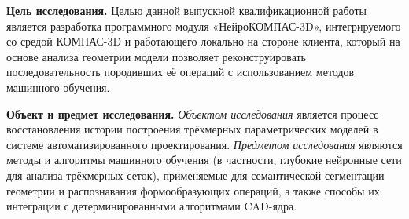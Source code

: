 \textbf{Цель исследования.} Целью данной выпускной квалификационной работы является разработка программного модуля «НейроКОМПАС-3D», интегрируемого со средой КОМПАС-3D и работающего локально на стороне клиента, который на основе анализа геометрии модели позволяет реконструировать последовательность породивших её операций с использованием методов машинного обучения.

\textbf{Объект и предмет исследования.} 
\textit{Объектом исследования} является процесс восстановления истории построения трёхмерных параметрических моделей в системе автоматизированного проектирования.
\textit{Предметом исследования} являются методы и алгоритмы машинного обучения (в частности, глубокие нейронные сети для анализа трёхмерных сеток), применяемые для семантической сегментации геометрии и распознавания формообразующих операций, а также способы их интеграции с детерминированными алгоритмами CAD-ядра.


